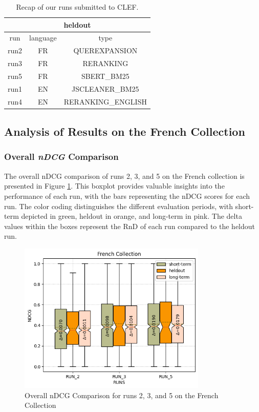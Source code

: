 \begin{table}[!h]
    \centering
    \begin{tabular}{ |c|c|c| }
        \hline
        \hline
        \multicolumn{3}{|c|}{heldout} \\ \hline
        run  & language & type \\ \hline
        run2 &   FR   & QUEREXPANSION \\
        run3 &   FR   & RERANKING \\
        run5 &   FR   & SBERT\_BM25 \\
        \hline
        run1 &   EN   & JSCLEANER\_BM25 \\
        run4 &   EN   & RERANKING\_ENGLISH \\
        \hline
    \end{tabular}
    \caption{Recap of our runs submitted to \ac{CLEF}.}
    \label{tab:runs_recap}
\end{table}

\newpage
\subsection{Analysis of Results on the French Collection}
\enlargethispage{5\baselineskip}
\subsubsection{Overall \textit{nDCG} Comparison}  \label{sec:ndcg_comparison_french}

The overall \ac{nDCG} comparison of runs 2, 3, and 5 on the French collection is presented in Figure \ref{fig:overall_ndcg_french_boxplot}. 
This boxplot provides valuable insights into the performance of each run, with the bars representing the \ac{nDCG} scores for each run. 
The color coding distinguishes the different evaluation periods, with short-term depicted in green, heldout in orange, and long-term in pink. 
The delta values within the boxes represent the \ac{RnD} of each run compared to the heldout run.

\begin{figure}[!h]
\centering
\includegraphics[width=0.8\textwidth]{figure/StatisticalAnalysis/BoxPlot/NDGC French.png}
\caption{Overall \ac{nDCG} Comparison for runs 2, 3, and 5 on the French Collection}
\label{fig:overall_ndcg_french_boxplot}
\end{figure}

